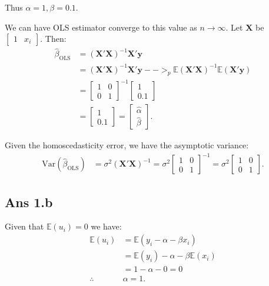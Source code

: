 \documentclass{article}
\begin{document}
Thus \( \alpha = 1, \beta = 0.1 \).

We can have OLS estimator converge to this value as \( n \to \infty \). Let \( \mathbf{X} \) be \( \begin{bmatrix} 1 & x_i \end{bmatrix} \). Then:
\begin{align*}
\hat{\beta}_{\text{OLS}} &= (\mathbf{X}' \mathbf{X})^{-1} \mathbf{X}' \mathbf{y} \\
                         &= (\mathbf{X}' \mathbf{X})^{-1} \mathbf{X}' \mathbf{y} -->_p \mathbb{E}(\mathbf{X}' \mathbf{X})^{-1} \mathbb{E}(\mathbf{X}' \mathbf{y}) \\
                         &= \begin{bmatrix} 1 & 0 \\ 0 & 1 \end{bmatrix}^{-1} \begin{bmatrix} 1 \\ 0.1 \end{bmatrix} \\
                         &= \begin{bmatrix} 1 \\ 0.1 \end{bmatrix} = \begin{bmatrix} \hat{\alpha} \\ \hat{\beta} \end{bmatrix}. 
\end{align*}

Given the homoscedasticity error, we have the asymptotic variance:
\begin{align*}
\text{Var}(\hat{\beta}_{\text{OLS}}) &= \sigma^2 (\mathbf{X}' \mathbf{X})^{-1} = \sigma^2 \begin{bmatrix} 1 & 0 \\ 0 & 1 \end{bmatrix}^{-1} = \sigma^2 \begin{bmatrix} 1 & 0 \\ 0 & 1 \end{bmatrix}.
\end{align*}

\subsection*{Ans 1.b}
Given that \( \mathbb{E}(u_i) = 0 \) we have:
\begin{align*}
\mathbb{E}(u_i) &= \mathbb{E}(y_i - \alpha - \beta x_i) \\
                &= \mathbb{E}(y_i) - \alpha - \beta \mathbb{E}(x_i) \\
                &= 1 - \alpha - 0 = 0  \\
\therefore \quad &\alpha = 1.
\end{align*}
\end{document}
